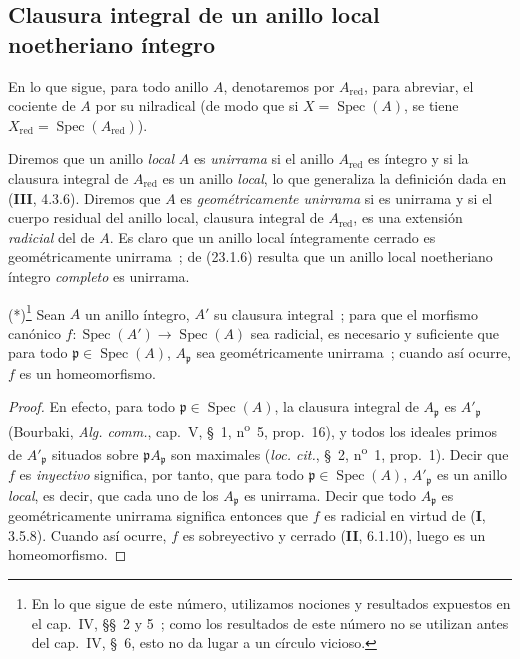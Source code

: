 \subsection{Clausura integral de un anillo local noetheriano íntegro}
\label{subsection:0.23.2-es}

\begin{env}[23.2.1]
\label{0.23.2.1-es}
En lo que sigue, para todo anillo $A$, denotaremos por $A_{\mathrm{red}}$, para
abreviar, el cociente de $A$ por su nilradical (de modo que si
$X=\operatorname{Spec}(A)$, se tiene
$X_{\mathrm{red}}=\operatorname{Spec}(A_{\mathrm{red}})$).

Diremos que un anillo \emph{local} $A$ es \emph{unirrama} si el anillo
$A_{\mathrm{red}}$ es íntegro y si la clausura integral de
$A_{\mathrm{red}}$ es un anillo \emph{local}, lo que generaliza la definición
dada en (\textbf{III}, 4.3.6). Diremos que $A$ es \emph{geométricamente
unirrama} si es unirrama y si el cuerpo residual del anillo local,
clausura integral de $A_{\mathrm{red}}$, es una extensión \emph{radicial}
del de $A$. Es claro que un anillo local íntegramente cerrado es
geométricamente unirrama~; de (23.1.6) resulta que un anillo local
noetheriano íntegro \emph{completo} es unirrama.
\end{env}

\begin{lemma}[23.2.2]
\label{0.23.2.2-es}
\textnormal{(*)}\footnote{En lo que sigue de este número, utilizamos
nociones y resultados expuestos en el cap.~IV, §§~2 y 5~; como los resultados de
este número no se utilizan antes del cap.~IV, §~6, esto no da lugar a un
círculo vicioso.} Sean $A$ un anillo íntegro, $A'$ su clausura integral~; para
que el morfismo canónico
$f:\operatorname{Spec}(A')\to\operatorname{Spec}(A)$ sea radicial, es necesario y
suficiente que para todo $\mathfrak p\in\operatorname{Spec}(A)$,
$A_{\mathfrak p}$ sea geométricamente unirrama~; cuando así ocurre,
$f$ es un homeomorfismo.
\end{lemma}

\begin{proof}
En efecto, para todo $\mathfrak p\in\operatorname{Spec}(A)$, la clausura
integral de $A_{\mathfrak p}$ es $A'_{\mathfrak p}$ (Bourbaki,
\emph{Alg. comm.}, cap.~V, §~1, n\textsuperscript{o}~5, prop.~16), y todos
los ideales primos de $A'_{\mathfrak p}$ situados sobre
$\mathfrak pA_{\mathfrak p}$ son maximales (\emph{loc. cit.}, §~2,
n\textsuperscript{o}~1, prop.~1). Decir que $f$ es \emph{inyectivo} significa, por tanto, que
para todo $\mathfrak p\in\operatorname{Spec}(A)$, $A'_{\mathfrak p}$ es un
anillo \emph{local}, es decir, que cada uno de los $A_{\mathfrak p}$ es
unirrama. Decir que todo $A_{\mathfrak p}$ es geométricamente unirrama
significa entonces que $f$ es radicial en virtud de (\textbf I, 3.5.8). Cuando así
ocurre, $f$ es sobreyectivo y cerrado (\textbf{II}, 6.1.10), luego es un homeomorfismo.
\end{proof}

